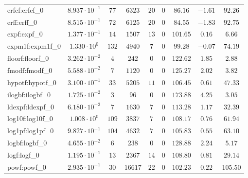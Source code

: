 \begin{tabular}{|l|c|c|c|c|c|c|c|c|}
erfcf:erfcf\_0               & $ 8.937 \cdot 10^{-1} $ & $ 77     $ & $ 6323   $ & $ 20  $ & $ 0   $ & $ 86.16       $ & $ -1.61   $ & $ 92.26   $ \\
erff:erff\_0                 & $ 8.515 \cdot 10^{-1} $ & $ 72     $ & $ 6125   $ & $ 20  $ & $ 0   $ & $ 84.55       $ & $ -1.83   $ & $ 92.75   $ \\
expf:expf\_0                 & $ 1.377 \cdot 10^{-1} $ & $ 14     $ & $ 1507   $ & $ 13  $ & $ 0   $ & $ 101.65      $ & $ 0.16    $ & $ 6.66    $ \\
expm1f:expm1f\_0             & $ 1.330 \cdot 10^{0}  $ & $ 132    $ & $ 4940   $ & $ 7   $ & $ 0   $ & $ 99.28       $ & $ -0.07   $ & $ 74.19   $ \\
floorf:floorf\_0             & $ 3.262 \cdot 10^{-2} $ & $ 4      $ & $ 242    $ & $ 0   $ & $ 0   $ & $ 122.62      $ & $ 1.85    $ & $ 2.88    $ \\
fmodf:fmodf\_0               & $ 5.588 \cdot 10^{-2} $ & $ 7      $ & $ 1120   $ & $ 0   $ & $ 0   $ & $ 125.27      $ & $ 2.02    $ & $ 3.82    $ \\
hypotf:hypotf\_0             & $ 3.100 \cdot 10^{-1} $ & $ 33     $ & $ 5205   $ & $ 11  $ & $ 0   $ & $ 106.45      $ & $ 0.61    $ & $ 47.33   $ \\
ilogbf:ilogbf\_0             & $ 1.725 \cdot 10^{-2} $ & $ 3      $ & $ 96     $ & $ 0   $ & $ 0   $ & $ 173.88      $ & $ 4.25    $ & $ 3.05    $ \\
ldexpf:ldexpf\_0             & $ 6.180 \cdot 10^{-2} $ & $ 7      $ & $ 1630   $ & $ 7   $ & $ 0   $ & $ 113.28      $ & $ 1.17    $ & $ 32.39   $ \\
log10f:log10f\_0             & $ 1.008 \cdot 10^{0}  $ & $ 109    $ & $ 3837   $ & $ 7   $ & $ 0   $ & $ 108.17      $ & $ 0.76    $ & $ 61.94   $ \\
log1pf:log1pf\_0             & $ 9.827 \cdot 10^{-1} $ & $ 104    $ & $ 4632   $ & $ 7   $ & $ 0   $ & $ 105.83      $ & $ 0.55    $ & $ 63.10   $ \\
logbf:logbf\_0               & $ 4.655 \cdot 10^{-2} $ & $ 6      $ & $ 238    $ & $ 0   $ & $ 0   $ & $ 128.88      $ & $ 2.24    $ & $ 5.17    $ \\
logf:logf\_0                 & $ 1.195 \cdot 10^{-1} $ & $ 13     $ & $ 2367   $ & $ 14  $ & $ 0   $ & $ 108.80      $ & $ 0.81    $ & $ 29.14   $ \\
powf:powf\_0                 & $ 2.935 \cdot 10^{-1} $ & $ 30     $ & $ 16617  $ & $ 22  $ & $ 0   $ & $ 102.23      $ & $ 0.22    $ & $ 105.50  $ \\

\end{tabular}
